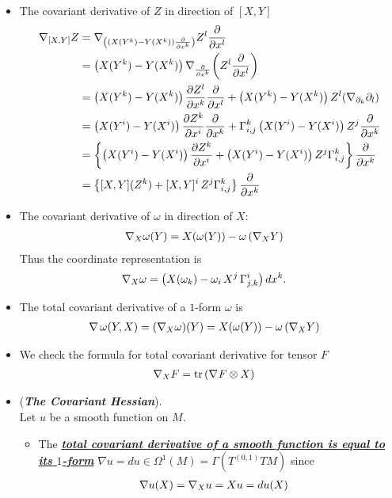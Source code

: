\documentclass[11pt]{article}
\begin{document}
\begin{itemize}
\item The covariant derivative of $Z$ in direction of $[X, Y]$
\begin{align}
\nabla_{[X, Y]}{Z} &= \nabla_{\left(\left(X(Y^k) - Y(X^k)\right)\frac{\partial }{ \partial x^k}\right)}{Z^l \frac{\partial }{ \partial x^l}} \nonumber\\
&= \left(X(Y^k) - Y(X^k)\right)\nabla_{\frac{\partial }{ \partial x^k}}{\left(Z^l \frac{\partial }{ \partial x^l}\right)} \nonumber\\
&= \left(X(Y^k) - Y(X^k)\right)\frac{\partial Z^l}{ \partial x^k}\frac{\partial }{ \partial x^l} + \left(X(Y^k) - Y(X^k)\right)Z^l (\nabla_{\partial_k}{\partial_l}) \nonumber\\
&=  \left(X(Y^i) - Y(X^i)\right)\frac{\partial Z^k}{ \partial x^i}\frac{\partial }{ \partial x^k} + \Gamma_{i,j}^{k}\left(X(Y^i) - Y(X^i)\right)Z^j \frac{\partial }{ \partial x^k} \nonumber\\
&= \left\{\left(X(Y^i) - Y(X^i)\right)\frac{\partial Z^k}{ \partial x^i} + \left(X(Y^i) - Y(X^i)\right)Z^j\Gamma_{i,j}^{k}\right\}\frac{\partial }{ \partial x^k} \nonumber\\
&= \left\{[X, Y](Z^k) + [X, Y]^i\,Z^j\Gamma_{i,j}^{k}\right\}\frac{\partial }{ \partial x^k} \label{eqn: affine_connection_lie_bracket}
\end{align}

\item The covariant derivative of $\omega$ in direction of $X$:
\begin{align*}
\nabla_{X}{\omega}(Y) &= X(\omega(Y)) - \omega\left(\nabla_{X}{Y}\right)
\end{align*}
Thus the coordinate representation is 
\begin{align}
\nabla_{X}{\omega} &= \left(X(\omega_k) -  \omega_i\,X^j\, \Gamma_{j,k}^{i}\right) dx^k. \label{eqn: covariant_derivative_1_form}
\end{align}

\item The total covariant derivative of a $1$-form $\omega$ is
\begin{align*}
\nabla\,\omega(Y, X) &= (\nabla_{X}{\omega})(Y) = X(\omega(Y)) - \omega\left(\nabla_{X}{Y}\right)
\end{align*}

\item We check the formula for total covariant derivative for tensor $F$
\begin{align*}
\nabla_{X}{F} &= \mathrm{tr}\left(\nabla_{}{F} \otimes X \right)
\end{align*}


\item \begin{example}(\textbf{\emph{The Covariant Hessian}}).\\
Let $u$ be a smooth function on $M$.
\begin{itemize}
\item The \underline{\emph{\textbf{total covariant derivative of a smooth function is equal to its $1$-form}}} $\nabla u = du \in \Omega^1(M) = \Gamma(T^{(0,1)}TM)$ since 
\begin{align*}
\nabla u(X) &= \nabla_{X}{u} = Xu = du(X)
\end{align*}


\end{itemize}
\end{example}
\end{itemize}
\end{document}
